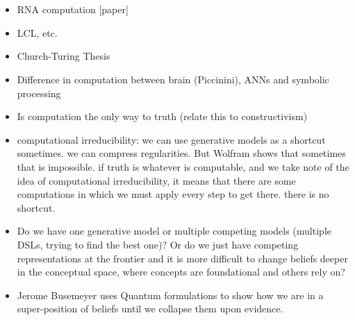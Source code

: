 \section{}

\subsection{}
\begin{itemize}
    \item RNA computation [paper]
    \item LCL, etc.
    \item Church-Turing Thesis
    \item Difference in computation between brain (Piccinini), ANNs and symbolic processing
    \item Is computation the only way to truth (relate this to constructivism)
    \item computational irreducibility: we can use generative models as a shortcut sometimes. we can compress regularities. But Wolfram shows that sometimes that is impossible. if truth is whatever is computable, and we take note of the idea of computational irreducibility, it means that there are some computations in which we must apply every step to get there. there is no shortcut. 
\end{itemize}

\begin{itemize}
    \item Do we have one generative model or multiple competing models (multiple DSLs, trying to find the best one)? Or do we just have competing representations at the frontier and it is more difficult to change beliefs deeper in the conceptual space, where concepts are foundational and others rely on?
    
    \item Jerome Busemeyer uses Quantum formulations to show how we are in a super-position of beliefs until we collapse them upon evidence. 
\end{itemize}













